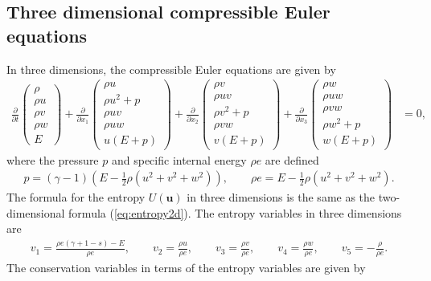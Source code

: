 \documentclass[preprint,10pt]{article}
\theoremstyle{definition}
\theoremstyle{lemma}
\theoremstyle{theorem}
\theoremstyle{assumption}
\newcommand{\pd}[2]{\frac{\partial#1}{\partial#2}}
\newcommand{\LRp}[1]{\left( #1 \right)}
\begin{document}
{\subsection{Three dimensional compressible Euler equations}

In three dimensions, the compressible Euler equations are given by
\begin{align}
\pd{}{t}\LRp{\begin{array}{c}
\rho\\
\rho u\\
\rho v\\
\rho w\\
E
\end{array}} +
\pd{}{x_1}\LRp{\begin{array}{c}
\rho u\\
\rho u^2+p\\
\rho uv\\
\rho uw\\
u(E+p)
\end{array}} + \pd{}{x_2}\LRp{\begin{array}{c}
\rho v\\
\rho uv\\
\rho v^2+p\\
\rho vw\\
v(E+p)
\end{array}}  + \pd{}{x_3}\LRp{\begin{array}{c}
\rho w\\
\rho uw\\
\rho vw\\
\rho w^2+p\\
w(E+p)
\end{array}} &= 0,
\label{eq:euler3d}
\end{align}
where the pressure $p$ and specific internal energy $\rho e$ are defined 
\begin{align}
p = (\gamma-1)\LRp{E - \frac{1}{2}\rho (u^2+v^2+w^2)}, \qquad \rho e = E - \frac{1}{2}\rho (u^2+v^2+w^2).  
\label{eq:pressure3d}
\end{align}
The formula for the entropy $U(\bm{u})$ in three dimensions is the same as the two-dimensional formula (\ref{eq:entropy2d}).  
 The entropy variables in three dimensions are 
\begin{align}
v_1 = \frac{\rho e (\gamma + 1 - s) - E}{\rho e}, \qquad v_2 = \frac{\rho u}{\rho e}, \qquad v_3 = \frac{\rho v}{\rho e}, \qquad v_4 = \frac{\rho w}{\rho e}, \qquad v_5 = -\frac{\rho}{\rho e}.
\end{align}
The conservation variables in terms of the entropy variables are given by
}
\end{document}
